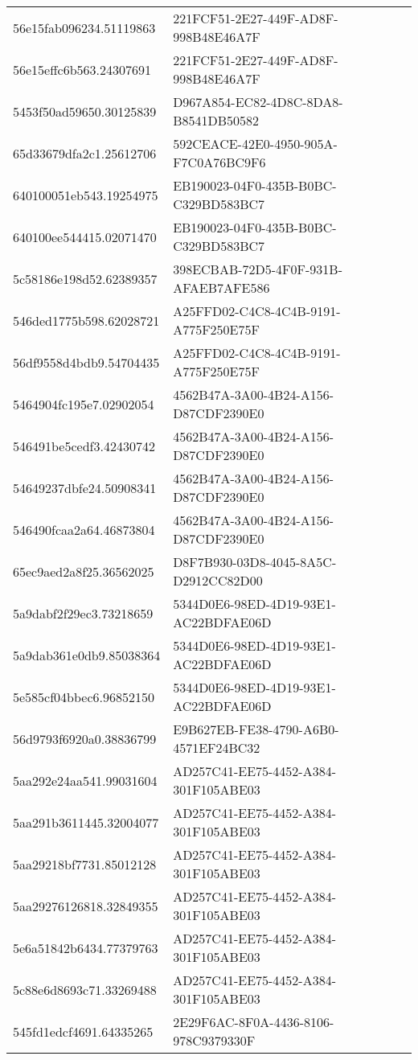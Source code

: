 \begin{tabular}{ll}
56e15fab096234.51119863 & 221FCF51-2E27-449F-AD8F-998B48E46A7F \\
56e15effc6b563.24307691 & 221FCF51-2E27-449F-AD8F-998B48E46A7F \\
5453f50ad59650.30125839 & D967A854-EC82-4D8C-8DA8-B8541DB50582 \\
65d33679dfa2c1.25612706 & 592CEACE-42E0-4950-905A-F7C0A76BC9F6 \\
640100051eb543.19254975 & EB190023-04F0-435B-B0BC-C329BD583BC7 \\
640100ee544415.02071470 & EB190023-04F0-435B-B0BC-C329BD583BC7 \\
5c58186e198d52.62389357 & 398ECBAB-72D5-4F0F-931B-AFAEB7AFE586 \\
546ded1775b598.62028721 & A25FFD02-C4C8-4C4B-9191-A775F250E75F \\
56df9558d4bdb9.54704435 & A25FFD02-C4C8-4C4B-9191-A775F250E75F \\
5464904fc195e7.02902054 & 4562B47A-3A00-4B24-A156-D87CDF2390E0 \\
546491be5cedf3.42430742 & 4562B47A-3A00-4B24-A156-D87CDF2390E0 \\
54649237dbfe24.50908341 & 4562B47A-3A00-4B24-A156-D87CDF2390E0 \\
546490fcaa2a64.46873804 & 4562B47A-3A00-4B24-A156-D87CDF2390E0 \\
65ec9aed2a8f25.36562025 & D8F7B930-03D8-4045-8A5C-D2912CC82D00 \\
5a9dabf2f29ec3.73218659 & 5344D0E6-98ED-4D19-93E1-AC22BDFAE06D \\
5a9dab361e0db9.85038364 & 5344D0E6-98ED-4D19-93E1-AC22BDFAE06D \\
5e585cf04bbec6.96852150 & 5344D0E6-98ED-4D19-93E1-AC22BDFAE06D \\
56d9793f6920a0.38836799 & E9B627EB-FE38-4790-A6B0-4571EF24BC32 \\
5aa292e24aa541.99031604 & AD257C41-EE75-4452-A384-301F105ABE03 \\
5aa291b3611445.32004077 & AD257C41-EE75-4452-A384-301F105ABE03 \\
5aa29218bf7731.85012128 & AD257C41-EE75-4452-A384-301F105ABE03 \\
5aa29276126818.32849355 & AD257C41-EE75-4452-A384-301F105ABE03 \\
5e6a51842b6434.77379763 & AD257C41-EE75-4452-A384-301F105ABE03 \\
5c88e6d8693c71.33269488 & AD257C41-EE75-4452-A384-301F105ABE03 \\
545fd1edcf4691.64335265 & 2E29F6AC-8F0A-4436-8106-978C9379330F \\

\end{tabular}

